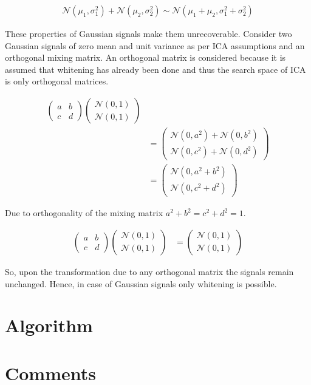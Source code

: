 \documentclass[11pt, a4paper]{article}
\begin{document}
\begin{align*}
	\mathcal{N}(\mu_1, \sigma_1^2) + \mathcal{N}(\mu_2, \sigma_2^2) \sim \mathcal{N}(\mu_1 + \mu_2, \sigma_1^2 + \sigma_2^2) 
\end{align*}

These properties of Gaussian signals make them unrecoverable. Consider two Gaussian signals of zero mean and unit variance as per ICA assumptions and an orthogonal mixing matrix. An orthogonal matrix is considered because it is assumed that whitening has already been done and thus the search space of ICA is only orthogonal matrices.

\begin{align*} 
	\begin{pmatrix} 
	a & b                 \\ 
	c & d                 
	\end{pmatrix}
	\begin{pmatrix} 
	\mathcal{N}(0, 1) \\ 
	\mathcal{N}(0, 1) 
	\end{pmatrix} \\
	  & = \begin{pmatrix} 
	\mathcal{N}(0, a^2) + \mathcal{N}(0, b^2) \\ 
	\mathcal{N}(0, c^2) + \mathcal{N}(0, d^2)
	\end{pmatrix}  \\
	  & = \begin{pmatrix} 
	\mathcal{N}(0, a^2+b^2)  \\ 
	\mathcal{N}(0, c^2 + d^2)
	\end{pmatrix}
\end{align*}

Due to orthogonality of the mixing matrix $a^2+b^2=c^2+d^2=1$.

\begin{align*}
	\begin{pmatrix} 
	a & b                 \\ 
	c & d                 
	\end{pmatrix}
	\begin{pmatrix} 
	\mathcal{N}(0, 1) \\ 
	\mathcal{N}(0, 1) 
	\end{pmatrix} 
	  & = \begin{pmatrix} 
	\mathcal{N}(0, 1) \\ 
	\mathcal{N}(0, 1) 
	\end{pmatrix} 
\end{align*}

So, upon the transformation due to any orthogonal matrix the signals remain unchanged. Hence, in case of Gaussian signals only whitening is possible. 

\section{Algorithm}

\section{Comments}
\end{document}
